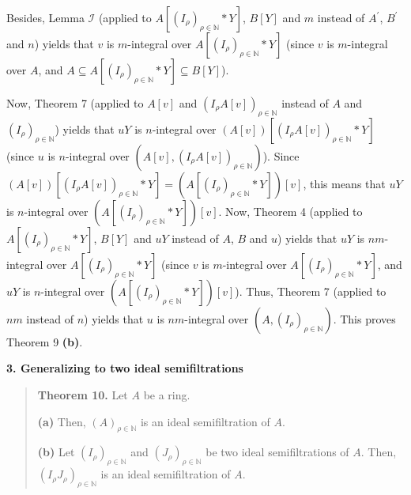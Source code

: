 \documentclass[12pt,final,notitlepage,onecolumn]{article}%
\begin{document}
Besides, Lemma $\mathcal{I}$ (applied to $A\left[  \left(  I_{\rho}\right)
_{\rho\in\mathbb{N}}\ast Y\right]  $, $B\left[  Y\right]  $ and $m$ instead of
$A^{\prime}$, $B^{\prime}$ and $n$) yields that $v$ is $m$-integral over
$A\left[  \left(  I_{\rho}\right)  _{\rho\in\mathbb{N}}\ast Y\right]  $ (since
$v$ is $m$-integral over $A$, and $A\subseteq A\left[  \left(  I_{\rho
}\right)  _{\rho\in\mathbb{N}}\ast Y\right]  \subseteq B\left[  Y\right]  $).

Now, Theorem 7 (applied to $A\left[  v\right]  $ and $\left(  I_{\rho}A\left[
v\right]  \right)  _{\rho\in\mathbb{N}}$ instead of $A$ and $\left(  I_{\rho
}\right)  _{\rho\in\mathbb{N}}$) yields that $uY$ is $n$-integral over
$\left(  A\left[  v\right]  \right)  \left[  \left(  I_{\rho}A\left[
v\right]  \right)  _{\rho\in\mathbb{N}}\ast Y\right]  $ (since $u$ is
$n$-integral over $\left(  A\left[  v\right]  ,\left(  I_{\rho}A\left[
v\right]  \right)  _{\rho\in\mathbb{N}}\right)  $). Since $\left(  A\left[
v\right]  \right)  \left[  \left(  I_{\rho}A\left[  v\right]  \right)
_{\rho\in\mathbb{N}}\ast Y\right]  =\left(  A\left[  \left(  I_{\rho}\right)
_{\rho\in\mathbb{N}}\ast Y\right]  \right)  \left[  v\right]  $, this means
that $uY$ is $n$-integral over $\left(  A\left[  \left(  I_{\rho}\right)
_{\rho\in\mathbb{N}}\ast Y\right]  \right)  \left[  v\right]  $. Now, Theorem
4 (applied to $A\left[  \left(  I_{\rho}\right)  _{\rho\in\mathbb{N}}\ast
Y\right]  $, $B\left[  Y\right]  $ and $uY$ instead of $A$, $B$ and $u$)
yields that $uY$ is $nm$-integral over $A\left[  \left(  I_{\rho}\right)
_{\rho\in\mathbb{N}}\ast Y\right]  $ (since $v$ is $m$-integral over $A\left[
\left(  I_{\rho}\right)  _{\rho\in\mathbb{N}}\ast Y\right]  $, and $uY$ is
$n$-integral over $\left(  A\left[  \left(  I_{\rho}\right)  _{\rho
\in\mathbb{N}}\ast Y\right]  \right)  \left[  v\right]  $). Thus, Theorem 7
(applied to $nm$ instead of $n$) yields that $u$ is $nm$-integral over
$\left(  A,\left(  I_{\rho}\right)  _{\rho\in\mathbb{N}}\right)  $. This
proves Theorem 9 \textbf{(b)}.

\begin{center}
\color{blue} \textbf{3. Generalizing to two ideal semifiltrations} \color{black}
\end{center}

\begin{quote}
\textbf{Theorem 10.} Let $A$ be a ring.

\textbf{(a)} Then, $\left(  A\right)  _{\rho\in\mathbb{N}}$ is an ideal
semifiltration of $A$.

\textbf{(b)} Let $\left(  I_{\rho}\right)  _{\rho\in\mathbb{N}}$ and $\left(
J_{\rho}\right)  _{\rho\in\mathbb{N}}$ be two ideal semifiltrations of $A$.
Then, $\left(  I_{\rho}J_{\rho}\right)  _{\rho\in\mathbb{N}}$ is an ideal
semifiltration of $A$.
\end{quote}
\end{document}
